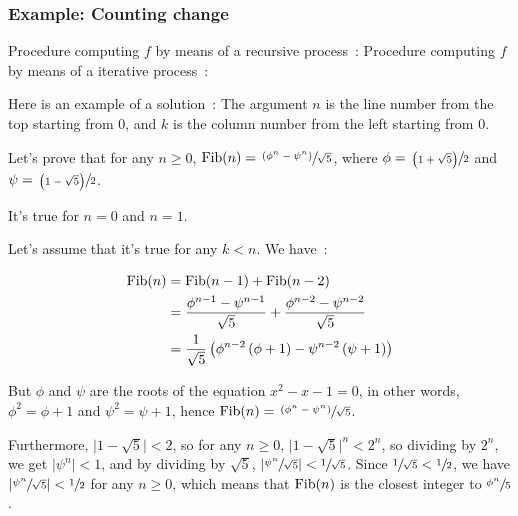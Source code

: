 \subsubsection{Example: Counting change}

\begin{exe}[1.11]
    Procedure computing $f$ by means of a recursive process :
    Procedure computing $f$ by means of a iterative process :
\end{exe}

\begin{exe}[1.12]
    Here is an example of a solution :
    The argument $n$ is the line number from the top starting from $0$, and 
    $k$ is the column number from the left starting from $0$.
\end{exe}

\begin{exe}[1.13]
    \label{1.13}
    Let’s prove that for any $n \geq 0$, $\operatorname{Fib}(n) = \sfrac{\left( \phi^n 
    - \psi^n \right)}{\sqrt{5}}$, where $\phi = \sfrac{\left( 1 + \sqrt{5} 
    \right)}{2}$ and $\psi = \sfrac{\left( 1 - \sqrt{5} \right)}{2}$.

    It’s true for $n = 0$ and $n = 1$.

    Let’s assume that it’s true for any $k < n$. We have :

    \begin{align*}
        \operatorname{Fib}(n) &= \operatorname{Fib}(n - 1) + \operatorname{Fib}(n - 2) \\
        &= \frac{\phi^{n - 1} - \psi^{n - 1}}{\sqrt{5}} + \frac{\phi^{n - 2} 
        - \psi^{n - 2}}{\sqrt{5}} \\
        &= \frac{1}{\sqrt{5}}\left(\phi^{n - 2}\left(\phi + 1\right) - \psi^{n 
        - 2}\left(\psi + 1\right) \right) \\
    \end{align*}

    But $\phi$ and $\psi$ are the roots of the equation $x^2 - x - 1 = 0$, in 
    other words, $\phi^2 = \phi + 1$ and $\psi^2 = \psi + 1$, hence $\operatorname{Fib}(n) 
    = \sfrac{\left(\phi^n - \psi^n \right)}{\sqrt{5}}$.

    Furthermore, $ \lvert 1 - \sqrt{5} \rvert < 2 $, so for any $n \geq 0$, 
    $ \lvert 1 - \sqrt{5} \rvert^n < 2^n $, so dividing by $2^n$, we get 
    $ \lvert \psi^n \rvert < 1 $, and by dividing by $\sqrt{5}$, $ \lvert 
    \sfrac{\psi^n}{\sqrt{5}} \rvert < \sfrac{1}{\sqrt{5}} $. Since 
    $ \sfrac{1}{\sqrt{5}} < \sfrac{1}{2} $, we have $ \lvert 
    \sfrac{\psi^n}{\sqrt{5}} \rvert < \sfrac{1}{2} $ for any $n \geq 0$, which 
    means that $\operatorname{Fib}(n)$ is the closest integer to $\sfrac{\phi^n}{5}$.

\end{exe}

